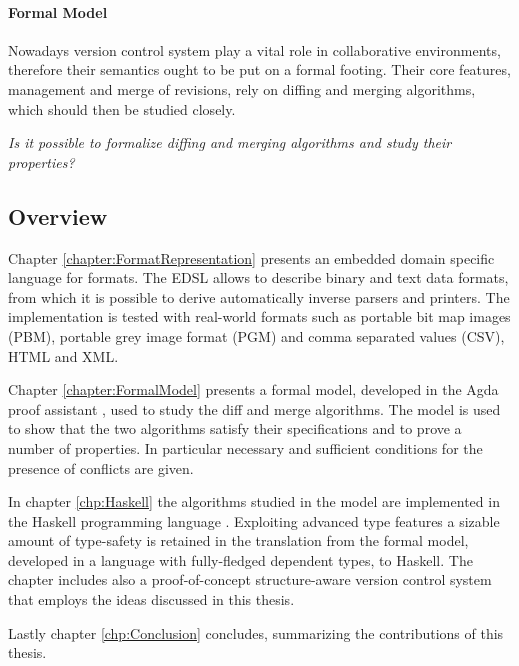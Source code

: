 \documentclass[../Thesis.tex]{subfiles}
\begin{document}
\paragraph{Formal Model}
Nowadays version control system play a vital role in collaborative environments, therefore their semantics ought to be put on a formal footing.
Their core features, management and merge of revisions, 
rely on diffing and merging algorithms, which should then be studied
closely.

\emph{Is it possible to formalize diffing and merging algorithms and study
their properties?}



\subsection{Overview}
Chapter \ref{chapter:FormatRepresentation} presents an embedded domain specific language for formats.
The EDSL allows to describe binary and text data formats, from which it 
is possible to derive automatically inverse parsers and printers.
The implementation is tested with real-world formats such as portable bit 
map images (PBM), portable grey image format (PGM) and comma separated 
values (CSV), HTML and XML.

Chapter \ref{chapter:FormalModel} presents a formal model, developed
in the Agda proof assistant \cite{Norell08, Bove09}, used to study the diff and merge algorithms.
The model is used to show that the two algorithms satisfy their specifications and to prove a number of properties.
In particular necessary and sufficient conditions for the presence of conflicts
are given.

In chapter \ref{chp:Haskell} the algorithms studied in the model are 
implemented in the Haskell programming language \cite{Marlow_haskell2010}.
Exploiting advanced type features a sizable amount of type-safety
is retained in the translation from the formal model, developed
in a language with fully-fledged dependent types, to Haskell.
The chapter includes also a proof-of-concept structure-aware version control system that employs the ideas discussed
in this thesis.

Lastly chapter \ref{chp:Conclusion} concludes, summarizing
the contributions of this thesis.


\end{document}
